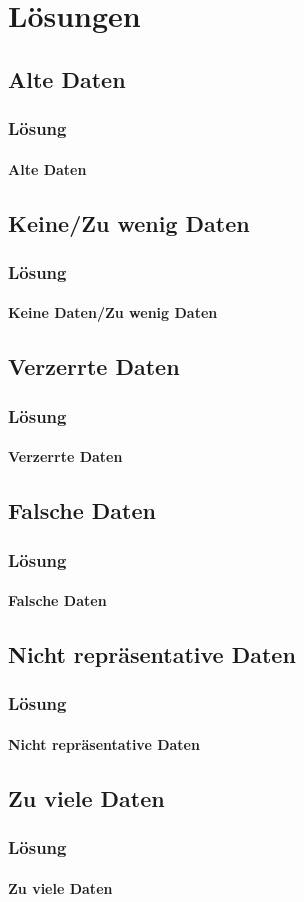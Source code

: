 \section{Lösungen}
\subsection{Alte Daten}
\begin{frame}
\frametitle{Lösung}
\framesubtitle{Alte Daten}
\end{frame}

\subsection{Keine/Zu wenig Daten}
\begin{frame}
\frametitle{Lösung}
\framesubtitle{Keine Daten/Zu wenig Daten}
\end{frame}

\subsection{Verzerrte Daten}
\begin{frame}
\frametitle{Lösung}
\framesubtitle{Verzerrte Daten}
\end{frame}

\subsection{Falsche Daten}
\begin{frame}
\frametitle{Lösung}
\framesubtitle{Falsche Daten}
\end{frame}

\subsection{Nicht repräsentative Daten}
\begin{frame}
\frametitle{Lösung}
\framesubtitle{Nicht repräsentative Daten}
\end{frame}

\subsection{Zu viele Daten}
\begin{frame}
\frametitle{Lösung}
\framesubtitle{Zu viele Daten}
\end{frame}
